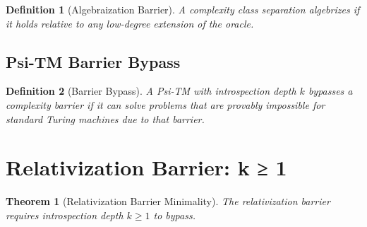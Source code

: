 \documentclass[11pt]{article}
\newtheorem{definition}{Definition}
\newtheorem{theorem}{Theorem}
\begin{document}
\begin{definition}[Algebraization Barrier]
A complexity class separation algebrizes if it holds relative to any low-degree extension of the oracle.
\end{definition}

\subsection{Psi-TM Barrier Bypass}

\begin{definition}[Barrier Bypass]
A Psi-TM with introspection depth $k$ bypasses a complexity barrier if it can solve problems that are provably impossible for standard Turing machines due to that barrier.
\end{definition}

\section{Relativization Barrier: k ≥ 1}

\begin{theorem}[Relativization Barrier Minimality]
The relativization barrier requires introspection depth $k \geq 1$ to bypass.
\end{theorem}
\end{document}
